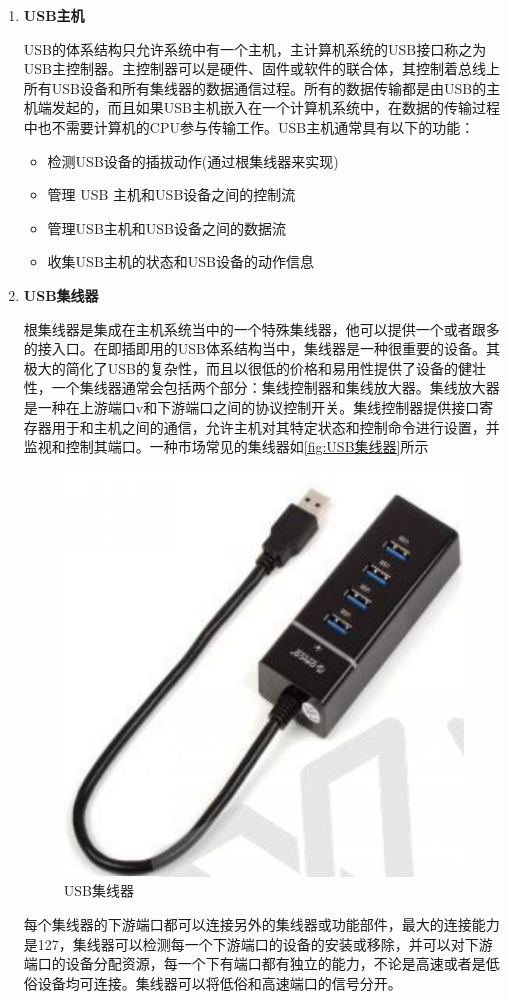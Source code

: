 \begin{enumerate}
\item \textbf{USB主机}

	USB的体系结构只允许系统中有一个主机，主计算机系统的USB接口称之为USB主控制器。主控制器可以是硬件、固件或软件的联合体，其控制着总线上所有USB设备和所有集线器的数据通信过程。所有的数据传输都是由USB的主机端发起的，而且如果USB主机嵌入在一个计算机系统中，在数据的传输过程中也不需要计算机的CPU参与传输工作。USB主机通常具有以下的功能：
	\begin{itemize}
	\item 检测USB设备的插拔动作(通过根集线器来实现)
	\item 管理 USB 主机和USB设备之间的控制流
	\item 管理USB主机和USB设备之间的数据流
	\item 收集USB主机的状态和USB设备的动作信息
	\end{itemize}
\item \textbf{USB集线器}
	
	根集线器是集成在主机系统当中的一个特殊集线器，他可以提供一个或者跟多的接入口。在即插即用的USB体系结构当中，集线器是一种很重要的设备。其极大的简化了USB的复杂性，而且以很低的价格和易用性提供了设备的健壮性，一个集线器通常会包括两个部分：集线控制器和集线放大器。集线放大器是一种在上游端口v和下游端口之间的协议控制开关。集线控制器提供接口寄存器用于和主机之间的通信，允许主机对其特定状态和控制命令进行设置，并监视和控制其端口。一种市场常见的集线器如\autoref{fig:USB集线器}所示
\begin{figure}[!ht]
\centering
\includegraphics[width=.5\textwidth]{./graphics/usb-hub.pdf}
\caption{USB集线器}\label{fig:USB集线器}
\end{figure}

每个集线器的下游端口都可以连接另外的集线器或功能部件，最大的连接能力是127，集线器可以检测每一个下游端口的设备的安装或移除，并可以对下游端口的设备分配资源，每一个下有端口都有独立的能力，不论是高速或者是低俗设备均可连接。集线器可以将低俗和高速端口的信号分开。


\end{enumerate}
